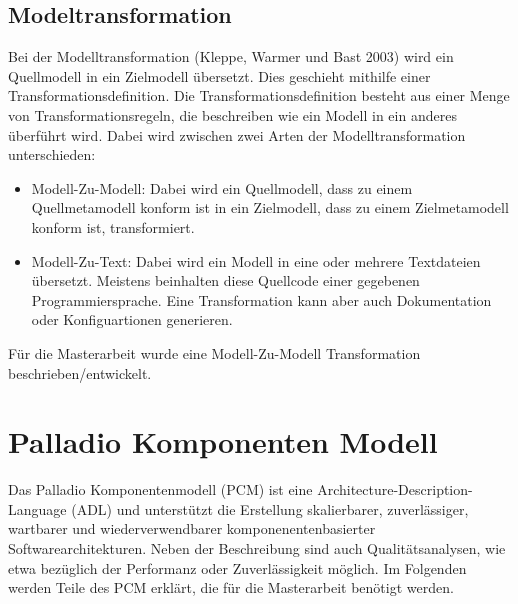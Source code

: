 \subsection{Modeltransformation}
Bei der Modelltransformation (Kleppe, Warmer und Bast 2003) wird ein Quellmodell in ein Zielmodell übersetzt. Dies geschieht mithilfe einer Transformationsdefinition. Die Transformationsdefinition besteht aus einer Menge von Transformationsregeln, die beschreiben wie ein Modell in ein anderes überführt wird. Dabei wird zwischen zwei Arten der Modelltransformation unterschieden:
\begin{itemize}
    \item Modell-Zu-Modell: Dabei wird ein Quellmodell, dass zu einem Quellmetamodell konform ist in ein Zielmodell, dass zu einem Zielmetamodell konform ist, transformiert.
    \item Modell-Zu-Text: Dabei wird ein Modell in eine oder mehrere Textdateien übersetzt. Meistens beinhalten diese Quellcode einer gegebenen Programmiersprache. Eine Transformation kann aber auch Dokumentation oder Konfiguartionen generieren.
\end{itemize}
Für die Masterarbeit wurde eine Modell-Zu-Modell Transformation beschrieben/entwickelt.
\section{Palladio Komponenten Modell}
\label{sec:palladio}
Das Palladio Komponentenmodell (PCM) \cite{palladio17} ist eine Architecture-Description-Language (ADL) und unterstützt die Erstellung skalierbarer, zuverlässiger, wartbarer und wiederverwendbarer komponenentenbasierter Softwarearchitekturen. Neben der Beschreibung sind auch Qualitätsanalysen, wie etwa bezüglich der Performanz oder Zuverlässigkeit möglich. Im Folgenden werden Teile des PCM erklärt, die für die Masterarbeit benötigt werden.

